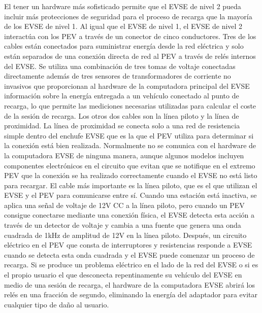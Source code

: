 \documentclass[12pt,a4paper,onecolumn,oneside]{report}
\begin{document}
El tener un hardware más sofisticado permite que el EVSE de nivel 2 pueda incluir más protecciones de seguridad para el proceso de recarga que la mayoría de los EVSE de nivel 1. Al igual que el EVSE de nivel 1, el EVSE de nivel 2 interactúa con los PEV a través de un conector de cinco conductores. Tres de los cables están conectados para suministrar energía desde la red eléctrica y solo están separados de una conexión directa de red al PEV a través de relés internos del EVSE. Se utiliza una combinación de tres tomas de voltaje conectadas directamente además de tres sensores de transformadores de corriente no invasivos que proporcionan al hardware de la computadora principal del EVSE información sobre la energía entregada a un vehículo conectado al punto de recarga, lo que permite las mediciones necesarias utilizadas para calcular el coste de la sesión de recarga. Los otros dos cables son la línea piloto y la línea de proximidad. La línea de proximidad se conecta solo a una red de resistencia simple dentro del enchufe EVSE que es la que el PEV utiliza para determinar si la conexión está bien realizada. Normalmente no se comunica con el hardware de la computadora EVSE de ninguna manera, aunque algunos modelos incluyen componentes electrónicos en el circuito que evitan que se notifique en el extremo PEV que la conexión se ha realizado correctamente cuando el EVSE no está listo para recargar. El cable más importante es la línea piloto, que es el que utilizan el EVSE y el PEV para comunicarse entre sí. Cuando una estación está inactiva, se aplica una señal de voltaje de 12V CC a la línea piloto, pero cuando un PEV consigue conectarse mediante una conexión física, el EVSE detecta esta acción a través de un detector de voltaje y cambia a una fuente que genera una onda cuadrada de 1kHz de amplitud de 12V en la línea piloto. Después, un circuito eléctrico en el PEV que consta de interruptores y resistencias responde a EVSE cuando se detecta esta onda cuadrada y el EVSE puede comenzar un proceso de recarga. Si se produce un problema eléctrico en el lado de la red del EVSE o si es el propio usuario el que desconecta repentinamente su vehículo del EVSE en medio de una sesión de recarga, el hardware de la computadora EVSE abrirá los relés en una fracción de segundo, eliminando la energía del adaptador para evitar cualquier tipo de daño al usuario.
\end{document}
